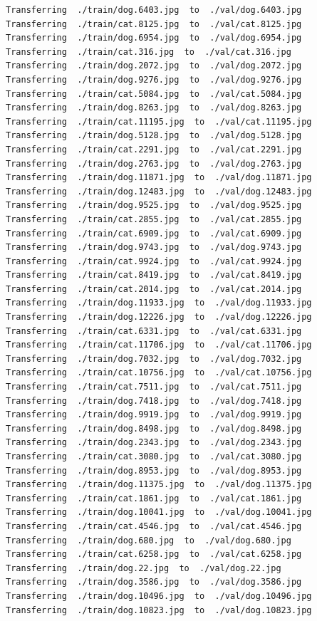 \documentclass[]{book}
\theoremstyle{definition}
\theoremstyle{definition}
\theoremstyle{definition}
\theoremstyle{remark}
\begin{document}
\begin{verbatim}
Transferring  ./train/dog.6403.jpg  to  ./val/dog.6403.jpg
Transferring  ./train/cat.8125.jpg  to  ./val/cat.8125.jpg
Transferring  ./train/dog.6954.jpg  to  ./val/dog.6954.jpg
Transferring  ./train/cat.316.jpg  to  ./val/cat.316.jpg
Transferring  ./train/dog.2072.jpg  to  ./val/dog.2072.jpg
Transferring  ./train/dog.9276.jpg  to  ./val/dog.9276.jpg
Transferring  ./train/cat.5084.jpg  to  ./val/cat.5084.jpg
Transferring  ./train/dog.8263.jpg  to  ./val/dog.8263.jpg
Transferring  ./train/cat.11195.jpg  to  ./val/cat.11195.jpg
Transferring  ./train/dog.5128.jpg  to  ./val/dog.5128.jpg
Transferring  ./train/cat.2291.jpg  to  ./val/cat.2291.jpg
Transferring  ./train/dog.2763.jpg  to  ./val/dog.2763.jpg
Transferring  ./train/dog.11871.jpg  to  ./val/dog.11871.jpg
Transferring  ./train/dog.12483.jpg  to  ./val/dog.12483.jpg
Transferring  ./train/dog.9525.jpg  to  ./val/dog.9525.jpg
Transferring  ./train/cat.2855.jpg  to  ./val/cat.2855.jpg
Transferring  ./train/cat.6909.jpg  to  ./val/cat.6909.jpg
Transferring  ./train/dog.9743.jpg  to  ./val/dog.9743.jpg
Transferring  ./train/cat.9924.jpg  to  ./val/cat.9924.jpg
Transferring  ./train/cat.8419.jpg  to  ./val/cat.8419.jpg
Transferring  ./train/cat.2014.jpg  to  ./val/cat.2014.jpg
Transferring  ./train/dog.11933.jpg  to  ./val/dog.11933.jpg
Transferring  ./train/dog.12226.jpg  to  ./val/dog.12226.jpg
Transferring  ./train/cat.6331.jpg  to  ./val/cat.6331.jpg
Transferring  ./train/cat.11706.jpg  to  ./val/cat.11706.jpg
Transferring  ./train/dog.7032.jpg  to  ./val/dog.7032.jpg
Transferring  ./train/cat.10756.jpg  to  ./val/cat.10756.jpg
Transferring  ./train/cat.7511.jpg  to  ./val/cat.7511.jpg
Transferring  ./train/dog.7418.jpg  to  ./val/dog.7418.jpg
Transferring  ./train/dog.9919.jpg  to  ./val/dog.9919.jpg
Transferring  ./train/dog.8498.jpg  to  ./val/dog.8498.jpg
Transferring  ./train/dog.2343.jpg  to  ./val/dog.2343.jpg
Transferring  ./train/cat.3080.jpg  to  ./val/cat.3080.jpg
Transferring  ./train/dog.8953.jpg  to  ./val/dog.8953.jpg
Transferring  ./train/dog.11375.jpg  to  ./val/dog.11375.jpg
Transferring  ./train/cat.1861.jpg  to  ./val/cat.1861.jpg
Transferring  ./train/dog.10041.jpg  to  ./val/dog.10041.jpg
Transferring  ./train/cat.4546.jpg  to  ./val/cat.4546.jpg
Transferring  ./train/dog.680.jpg  to  ./val/dog.680.jpg
Transferring  ./train/cat.6258.jpg  to  ./val/cat.6258.jpg
Transferring  ./train/dog.22.jpg  to  ./val/dog.22.jpg
Transferring  ./train/dog.3586.jpg  to  ./val/dog.3586.jpg
Transferring  ./train/dog.10496.jpg  to  ./val/dog.10496.jpg
Transferring  ./train/dog.10823.jpg  to  ./val/dog.10823.jpg

\end{verbatim}
\end{document}
